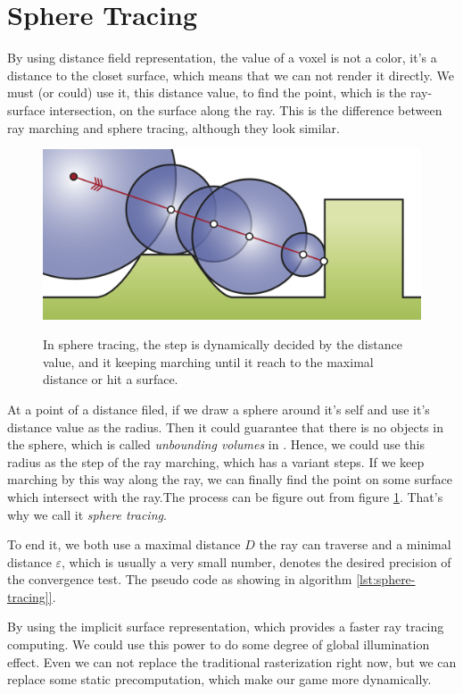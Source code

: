 \section{Sphere Tracing}
By using distance field representation, the value of a voxel is not a color, it's a distance to the closet surface, which means that we can not render it directly. We must (or could) use it, this distance value, to find the point, which is the ray-surface intersection, on the surface along the ray. This is the difference between ray marching and sphere tracing, although they look similar. 

\begin{figure}
	\includegraphics[width=1.0\textwidth]{graphics/df/sphere_tracing}
	\label{f:sphere-tracing}
	\caption{In sphere tracing, the step is dynamically decided by the distance value, and it keeping marching until it reach to the maximal distance or hit a surface.}
\end{figure}

At a point of a distance filed,  if we draw a sphere around it's self and use it's distance value as the radius. Then it could guarantee that there is no objects in the sphere, which is called \textit{unbounding volumes} in \cite{a:Ray-Tracing-Deterministic-3-DFractals}. Hence, we could use this radius as the step of the ray marching, which has a variant steps. If we keep marching by this way along the ray, we can finally find the point on some surface which intersect with the ray.The process can be figure out from figure \ref{f:sphere-tracing}. That's why we call it \textit{sphere tracing}.

To end it, we both use a maximal distance $D$ the ray can traverse and a minimal distance $\varepsilon$, which is usually a very small number, denotes the desired precision of the convergence test. The pseudo code as showing in algorithm \ref{lst:sphere-tracing]}.


By using the implicit surface representation, which provides a faster ray tracing computing. We could use this power to do some degree of global illumination effect. Even we can not replace the traditional rasterization right now, but we can replace some static precomputation, which make our game more dynamically. 

